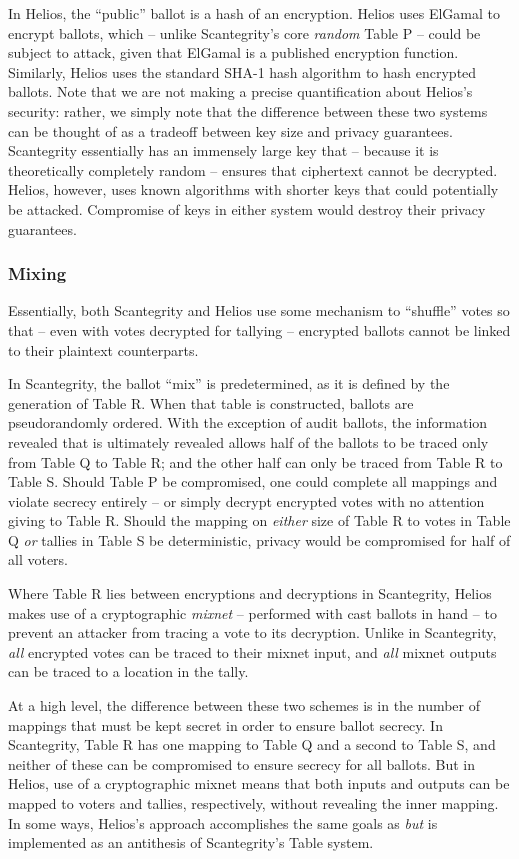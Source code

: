 \documentclass[10pt,twocolumn]{article}
\newcommand{\term}[1]{\textit{#1}}
\begin{document}
In Helios, the ``public'' ballot is a hash of an encryption. Helios uses ElGamal to encrypt ballots,
which -- unlike Scantegrity's core \emph{random} Table P -- could be subject to attack, given that
ElGamal is a published encryption function. Similarly, Helios uses the standard SHA-1 hash algorithm
to hash encrypted ballots. Note that we are not making a precise quantification about Helios's
security: rather, we simply note that the difference between these two systems can be thought of as
a tradeoff between key size and privacy guarantees. Scantegrity essentially has an immensely large
key that -- because it is theoretically completely random -- ensures that ciphertext cannot be
decrypted. Helios, however, uses known algorithms with shorter keys that could potentially be
attacked. Compromise of keys in either system would destroy their privacy guarantees.

\subsubsection{Mixing}

Essentially, both Scantegrity and Helios use some mechanism to ``shuffle'' votes so that -- even
with votes decrypted for tallying -- encrypted ballots cannot be linked to their plaintext
counterparts.

In Scantegrity, the ballot ``mix'' is predetermined, as it is defined by the generation of Table R.
When that table is constructed, ballots are pseudorandomly ordered. With the exception of audit
ballots, the information revealed that is ultimately revealed allows half of the ballots to be
traced only from Table Q to Table R; and the other half can only be traced from Table R to Table S.
Should Table P be compromised, one could complete all mappings and violate secrecy entirely -- or
simply decrypt encrypted votes with no attention giving to Table R. Should the mapping on
\emph{either} size of Table R to votes in Table Q \emph{or} tallies in Table S be deterministic,
privacy would be compromised for half of all voters.

Where Table R lies between encryptions and decryptions in Scantegrity, Helios makes use of a
cryptographic \term{mixnet} -- performed with cast ballots in hand -- to prevent an attacker from
tracing a vote to its decryption. Unlike in Scantegrity, \emph{all} encrypted votes can be traced to
their mixnet input, and \emph{all} mixnet outputs can be traced to a location in the tally.

At a high level, the difference between these two schemes is in the number of mappings that must be
kept secret in order to ensure ballot secrecy. In Scantegrity, Table R has one mapping to Table Q
and a second to Table S, and neither of these can be compromised to ensure secrecy for all ballots.
But in Helios, use of a cryptographic mixnet means that both inputs and outputs can be mapped to
voters and tallies, respectively, without revealing the inner mapping. In some ways, Helios's
approach accomplishes the same goals as \emph{but} is implemented as an antithesis of Scantegrity's
Table system.
\end{document}
